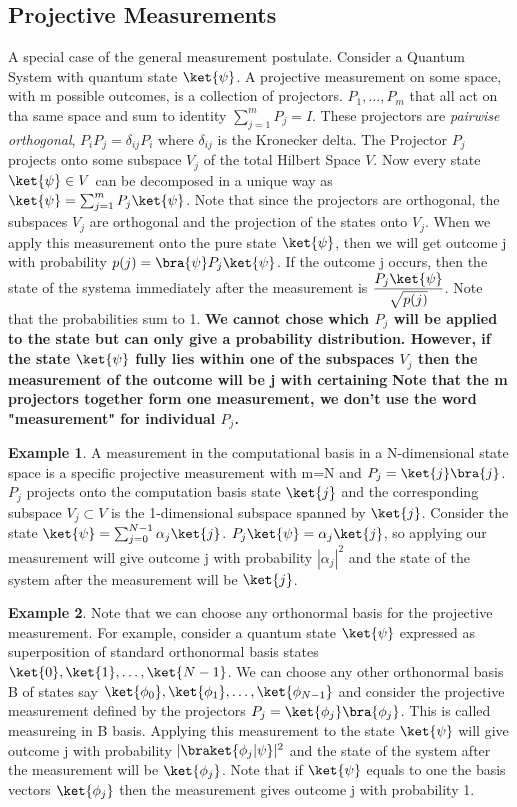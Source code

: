 \documentclass[12pt, oneside]{book}
\theoremstyle{definition}
\theoremstyle{definition}
\newtheorem{example}{Example}[section]
\theoremstyle{remark}
\begin{document}
\subsection{Projective Measurements}
A special case of the general measurement postulate. Consider a Quantum System with quantum state $\ket{\psi}$. A projective measurement on some space, with m possible outcomes, is a collection of projectors.
$P_1,\ldots,P_m$ that all act on tha same space and sum to identity $\sum_{j=1}^m P_j=I$. These projectors are \textit{pairwise orthogonal},
$P_iP_j=\delta_{ij}P_i$ where $\delta_{ij}$ is the Kronecker delta. The Projector $P_j$ projects onto some subspace $V_j$ of the total Hilbert Space $V$. 
Now every state $\ket{\psi} \in V$ can be decomposed in a unique way as $\ket{\psi}=\sum_{j=1}^m P_j\ket{\psi}$. Note that since the projectors
are orthogonal, the subspaces $V_j$ are orthogonal and the projection of the states onto $V_j$. When we apply this measurement onto the pure
state $\ket{\psi}$, then we will get outcome j with probability $p(j)=\bra{\psi}P_j\ket{\psi}$. If the outcome j occurs, then the state of the systema
immediately after the measurement is $\dfrac{P_j\ket{\psi}}{\sqrt{p(j)}}$. Note that the probabilities sum to 1.
\textbf{We cannot chose which $P_j$ will be applied to the state but can only give a probability distribution. However, if the state $\ket{\psi}$ fully lies within
one of the subspaces $V_j$ then the measurement of the outcome will be j with certaining}
\textbf{Note that the m projectors together form one measurement, we don't use the word "measurement" for individual $P_j$.}
\begin{example}
    A measurement in the computational basis in a N-dimensional state space is a specific projective measurement
    with m=N and $P_j=\ket{j}\bra{j}$. $P_j$ projects onto the computation basis state $\ket{j}$ and the corresponding
    subspace $V_j \subset V$  is the 1-dimensional subspace spanned by $\ket{j}$. 
    Consider the state $\ket{\psi} = \sum_{j=0}^{N-1} \alpha_j \ket{j}$. $P_j\ket{\psi}=\alpha_j\ket{j}$, so applying our measurement
    will give outcome j with probability $|\alpha_j|^2$ and the state of the system after the measurement will be $\ket{j}$.
\end{example}


\begin{example}
    Note that we can choose any orthonormal basis for the projective measurement. For example, consider
    a quantum state $\ket{\psi}$ expressed as superposition of standard orthonormal basis states $\ket{0},\ket{1},\ldots,\ket{N-1}$. 
    We can choose any other orthonormal basis B of states say $\ket{\phi_0},\ket{\phi_1},\ldots,\ket{\phi_{N-1}}$
    and consider the projective measurement defined by the projectors $P_j=\ket{\phi_j}\bra{\phi_j}$.
    This is called measureing in B basis. Applying this measurement to the state $\ket{\psi}$ will give 
    outcome j with probability $|\braket{\phi_j|\psi}|^2$ and the state of the system after the measurement will be $\ket{\phi_j}$.
    Note that if $\ket{\psi}$ equals to one the basis vectors $\ket{\phi_j}$ then the measurement
    gives outcome j with probability 1.
\end{example}
\end{document}
